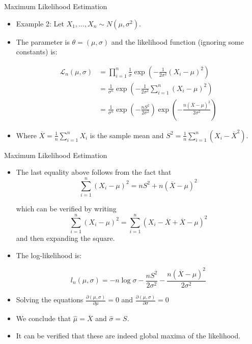 \documentclass[handout]{beamer}
\begin{document}
\begin{frame}{Maximum Likelihood Estimation}
\scriptsize{
\begin{itemize}
 \item Example 2: Let  $X_1,\dots, X_n \sim N(\mu,\sigma^2)$. 
 \item The parameter is $\theta=(\mu,\sigma)$ and the likelihood function (ignoring some constants) is:
 
 
  \begin{align}
\mathcal{L}_{n}(\mu,\sigma) & =\prod_{i=1}^n \frac{1}{\sigma} \exp \left( - \frac{1}{2\sigma^2} (X_i -\mu)^2 \right) \\
 & = \frac{1}{\sigma^n}\exp \left( - \frac{1}{2\sigma^2} \sum_{i=1}^n(X_i -\mu)^2 \right) \\
  & = \frac{1}{\sigma^n}\exp \left( - \frac{nS^2}{2\sigma^2} \right)\exp \left( - \frac{n(\overline{X}-\mu)^2}{2\sigma^2} \right)
 \end{align}

\item Where $\overline{X}=\frac{1}{n}\sum_{i=1}^nX_i$ is the sample mean and $S^2 = \frac{1}{n}\sum_{i=1}^n(X_i-\overline{X}^2)$.
\end{itemize}
} 
 
\end{frame}



\begin{frame}{Maximum Likelihood Estimation}
\scriptsize{
\begin{itemize}
\item The last equality above follows from the fact that 
\begin{displaymath}
 \sum_{i=1}^n(X_i -\mu)^2=nS^2+n(\overline{X}-\mu)^2
\end{displaymath}

which can be verified by writing
\begin{displaymath}
\sum_{i=1}^n(X_i -\mu)^2 = \sum_{i=1}^n(X_i - \overline{X} + \overline{X} -\mu)^2 
\end{displaymath}
and then expanding the square.
 
\item The log-likelihood is: 
 
 \begin{displaymath}
l_n(\mu,\sigma) = -n\log \sigma - \frac{nS^2}{2\sigma^2} - \frac{n(\overline{X}-\mu)^2}{2\sigma^2} 
 \end{displaymath}   

 
\item Solving the equations $\frac{\partial (\mu,\sigma)}{\partial \mu} = 0$ and $\frac{\partial (\mu,\sigma)}{\partial \sigma} = 0$

\item We conclude that $\hat{\mu} = \overline{X}$ and $\hat{\sigma}=S$. 

\item It can be verified that these are indeed global maxima of the likelihood.

\end{itemize}



} 
 
\end{frame}
\end{document}
